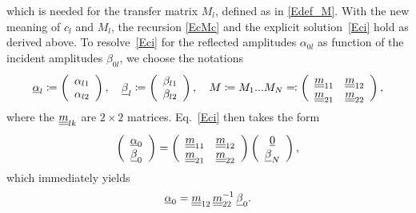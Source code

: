 which is needed for the transfer matrix $M_l$,
defined as in \cref{Edef_M}.
With the new meaning of $c_l$ and $M_l$,
the recursion \cref{EcMc} and the explicit solution~\cref{Eci}
hold as derived above.
To resolve~\cref{Eci} for the reflected amplitudes $\alpha_{0l}$
as function of the incident amplitudes $\beta_{0l}$,
we choose the notations
\begin{equation}
  \u\alpha_l
  \coloneqq \left(\begin{array}{c}\alpha_{l1}\\\alpha_{l2}\end{array}\right),\quad
  \u\beta_l
  \coloneqq \left(\begin{array}{c}\beta_{l1}\\\beta_{l2}\end{array}\right),\quad
  M\coloneqq M_1 ... M_N %
  \eqqcolon \left(\begin{array}{cc}\uu m_{11}&\uu m_{12}\\
                           \uu m_{21}&\uu m_{22}\end{array}\right),
\end{equation}
where the $\underline{\underline{m}}_{l k}$ are $2\times2$ matrices.
Eq.~\cref{Eci} then takes the form
\begin{equation}
  \left(\begin{array}{c}\underline{\alpha}_{0}\\\underline{\beta}_{0}\end{array}\right)
  =
  \left(\begin{array}{cc}\underline{\underline{m}}_{11}&\underline{\underline{m}}_{12}\\
    \underline{\underline{m}}_{21}&\underline{\underline{m}}_{22}\end{array}\right)
  \left(\begin{array}{c}\underline{0}\\\underline{\beta}_{N}\end{array}\right),
\end{equation}
which immediately yields
\begin{equation}
  \underline{\alpha}_0 = \underline{\underline{m}}_{12}\,\underline{\underline{m}}_{22}^{-1}\,\underline{\beta}_0.
\end{equation}
